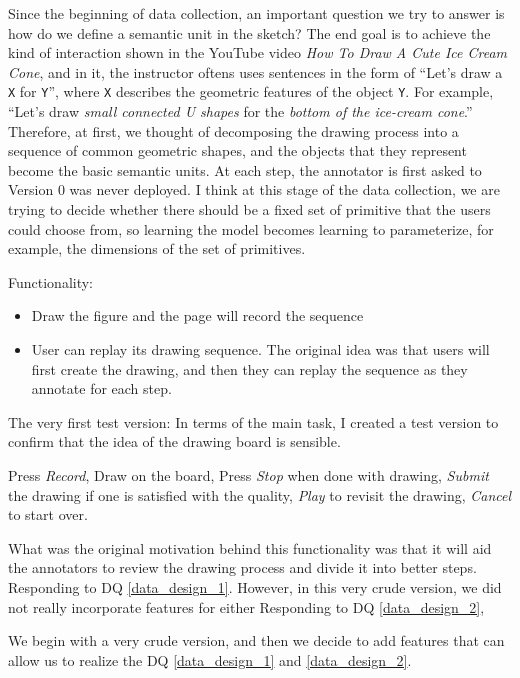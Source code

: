 Since the beginning of data collection, an important question we try to answer is how do we define a semantic unit in the sketch?  
The end goal is to achieve the kind of interaction shown in the YouTube video \textit{How To Draw A Cute Ice Cream Cone}, and in it, the instructor oftens uses sentences in the form of ``Let's draw a \texttt{X} for \texttt{Y}'', where \texttt{X} describes the geometric features of the object \texttt{Y}. For example, ``Let's draw \textit{small connected U shapes} for the \textit{bottom of the ice-cream cone}.'' Therefore, at first, we thought of decomposing the drawing process into a sequence of common geometric shapes, and the objects that they represent become the basic semantic units.      
At each step, the annotator is first asked to 
Version 0 was never deployed. I think at this stage of the data collection, we are trying to decide whether there should be a fixed set of primitive that the users could choose from, so learning the model becomes learning to parameterize, for example, the dimensions of the set of primitives. 

Functionality:
\begin{itemize}
    \item Draw the figure and the page will record the sequence 
    \item User can replay its drawing sequence. The original idea was that users will first create the drawing, and then they can replay the sequence as they annotate for each step. 
\end{itemize}

The very first test version:
In terms of the main task, I created a test version to confirm that the idea of the drawing board is sensible.

Press \textit{Record}, Draw on the board, Press \textit{Stop} when done with drawing, \textit{Submit} the drawing if one is satisfied with the quality, \textit{Play} to revisit the drawing, \textit{Cancel} to start over. 

What was the original motivation behind this functionality was that it will aid the annotators to review the drawing process and divide it into better steps. Responding to DQ \ref{data_design_1}. 
However, in this very crude version, we did not really incorporate features for either 
Responding to DQ \ref{data_design_2}, 

We begin with a very crude version, and then we decide to add features that can allow us to realize the DQ \ref{data_design_1} and \ref{data_design_2}.

